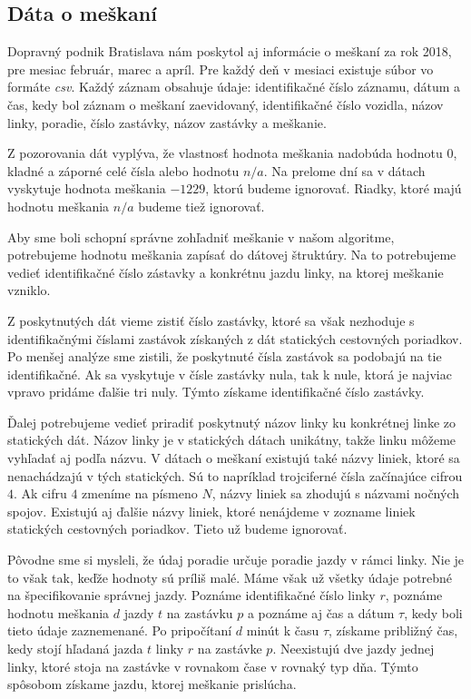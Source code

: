 \subsection{Dáta o meškaní}
\label{sec:delay-data}
Dopravný podnik Bratislava nám poskytol aj informácie o meškaní za rok 2018, pre mesiac február, marec a apríl. Pre každý deň v mesiaci existuje súbor vo formáte \textit{csv}. Každý záznam obsahuje údaje: identifikačné číslo záznamu, dátum a čas, kedy bol záznam o meškaní zaevidovaný, identifikačné číslo vozidla, názov linky, poradie, číslo zastávky, názov zastávky a meškanie.

Z pozorovania dát vyplýva, že vlastnosť hodnota meškania nadobúda hodnotu $0$, kladné a záporné celé čísla alebo hodnotu $n/a$. Na prelome dní sa v dátach vyskytuje hodnota meškania $-1229$, ktorú budeme ignorovať. Riadky, ktoré majú hodnotu meškania $n/a$ budeme tiež ignorovať.

Aby sme boli schopní správne zohľadniť meškanie v našom algoritme, potrebujeme hodnotu meškania zapísať do dátovej štruktúry. Na to potrebujeme vedieť identifikačné číslo zástavky a konkrétnu jazdu linky, na ktorej meškanie vzniklo. 

Z poskytnutých dát vieme zistiť číslo zastávky, ktoré sa však nezhoduje s identifikačnými číslami zastávok získaných z dát statických cestovných poriadkov. Po menšej analýze sme zistili, že poskytnuté čísla zastávok sa podobajú na tie identifikačné. Ak sa vyskytuje v čísle zastávky nula, tak k nule, ktorá je najviac vpravo pridáme ďalšie tri nuly. Týmto získame identifikačné číslo zastávky.

Ďalej potrebujeme vedieť priradiť poskytnutý názov linky ku konkrétnej linke zo statických dát. Názov linky je v statických dátach unikátny, takže linku môžeme vyhľadať aj podľa názvu. V dátach o meškaní existujú také názvy liniek, ktoré sa nenachádzajú v tých statických. Sú to napríklad trojciferné čísla začínajúce cifrou $4$. Ak cifru $4$ zmeníme na písmeno $N$, názvy liniek sa zhodujú s názvami nočných spojov. Existujú aj ďalšie názvy liniek, ktoré nenájdeme v zozname liniek statických cestovných poriadkov. Tieto už budeme ignorovať. 

Pôvodne sme si mysleli, že údaj poradie určuje poradie jazdy v rámci linky. Nie je to však tak, keďže hodnoty sú príliš malé. Máme však už všetky údaje potrebné na špecifikovanie správnej jazdy. Poznáme identifikačné číslo linky $r$, poznáme hodnotu meškania $d$ jazdy $t$ na zastávku $p$ a poznáme aj čas a dátum $\tau$, kedy boli tieto údaje zaznemenané. Po pripočítaní $d$ minút k času $\tau$, získame približný čas, kedy stojí hľadaná jazda $t$ linky $r$ na zastávke $p$. Neexistujú dve jazdy jednej linky, ktoré stoja na zastávke v rovnakom čase v rovnaký typ dňa. Týmto spôsobom získame jazdu, ktorej meškanie prislúcha.

